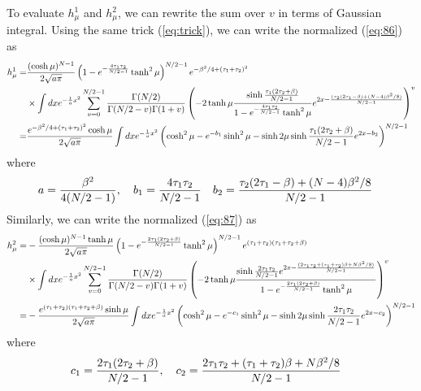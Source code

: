 \documentclass[11pt]{article}
\renewcommand{\>}{\rangle}
\newcommand{\<}{\langle}
\begin{document}
To evaluate $h_{\mu}^{1}$ and $h_{\mu}^{2}$, we can rewrite the
sum over $v$ in terms of Gaussian integral. Using the same trick
(\ref{eq:trick}), we can write the normalized (\ref{eq:86}) as 
\begin{align}
h_{\mu}^{1}= & \frac{(\cosh\mu)^{N-1}}{2\sqrt{a\pi}}\left(1-e^{-\frac{4\tau_{1}\tau_{2}}{N/2-1}}\tanh^{2}\mu\right)^{N/2-1}e^{-\beta^{2}/4+(\tau_{1}+\tau_{2})^{2}}\nonumber \\
 & \times\int dxe^{-\frac{1}{a}x^{2}}\sum_{v=0}^{N/2-1}\frac{\Gamma(N/2)}{\Gamma(N/2-v)\Gamma(1+v)}\left(-2\tanh\mu\frac{\sinh\frac{\tau_{1}(2\tau_{2}+\beta)}{N/2-1}}{1-e^{-\frac{4\tau_{1}\tau_{2}}{N/2-1}}\tanh^{2}\mu}e^{2x-\frac{(\tau_{2}(2\tau_{1}-\beta)+(N-4)\beta^{2}/8)}{N/2-1}}\right)^{v}\nonumber \\
= & \frac{e^{-\beta^{2}/4+(\tau_{1}+\tau_{2})^{2}}\cosh\mu}{2\sqrt{a\pi}}\int dxe^{-\frac{1}{a}x^{2}}\left(\cosh^{2}\mu-e^{-b_{1}}\sinh^{2}\mu-\sinh2\mu\sinh\frac{\tau_{1}(2\tau_{2}+\beta)}{N/2-1}e^{2x-b_{2}}\right)^{N/2-1}
\end{align}
where
\begin{align}
a & =\frac{\beta^{2}}{4(N/2-1)},\quad b_{1}=\frac{4\tau_{1}\tau_{2}}{N/2-1}\quad b_{2}=\frac{\tau_{2}(2\tau_{1}-\beta)+(N-4)\beta^{2}/8}{N/2-1}
\end{align}
Similarly, we can write the normalized (\ref{eq:87}) as 
\begin{align}
h_{\mu}^{2}= & -\frac{(\cosh\mu)^{N-1}\tanh\mu}{2\sqrt{a\pi}}\left(1-e^{-\frac{2\tau_{1}(2\tau_{2}+\beta)}{N/2-1}}\tanh^{2}\mu\right)^{N/2-1}e^{(\tau_{1}+\tau_{2})(\tau_{1}+\tau_{2}+\beta)}\nonumber \\
 & \times\int dxe^{-\frac{1}{a}x^{2}}\sum_{v=0}^{N/2-1}\frac{\Gamma(N/2)}{\Gamma(N/2-v)\Gamma(1+v)}\left(-2\tanh\mu\frac{\sinh\frac{2\tau_{1}\tau_{2}}{N/2-1}e^{2x-\frac{(2\tau_{1}\tau_{2}+(\tau_{1}+\tau_{2})\beta+N\beta^{2}/8)}{N/2-1}}}{1-e^{-\frac{2\tau_{1}(2\tau_{2}+\beta)}{N/2-1}}\tanh^{2}\mu}\right)^{v}\nonumber \\
= & -\frac{e^{(\tau_{1}+\tau_{2})(\tau_{1}+\tau_{2}+\beta)}\sinh\mu}{2\sqrt{a\pi}}\int dxe^{-\frac{1}{a}x^{2}}\left(\cosh^{2}\mu-e^{-c_{1}}\sinh^{2}\mu-\sinh2\mu\sinh\frac{2\tau_{1}\tau_{2}}{N/2-1}e^{2x-c_{2}}\right)^{N/2-1}
\end{align}
where
\begin{align}
c_{1} & =\frac{2\tau_{1}(2\tau_{2}+\beta)}{N/2-1},\quad c_{2}=\frac{2\tau_{1}\tau_{2}+(\tau_{1}+\tau_{2})\beta+N\beta^{2}/8}{N/2-1}
\end{align}



\end{document}
